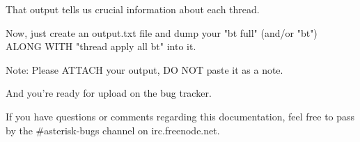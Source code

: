 That output tells us crucial information about each thread.

Now, just create an output.txt file and dump your "bt full"
(and/or "bt") ALONG WITH "thread apply all bt" into it.

Note: Please ATTACH your output, DO NOT paste it as a note.

And you're ready for upload on the bug tracker.

If you have questions or comments regarding this documentation, feel
free to pass by the \#asterisk-bugs channel on irc.freenode.net.


